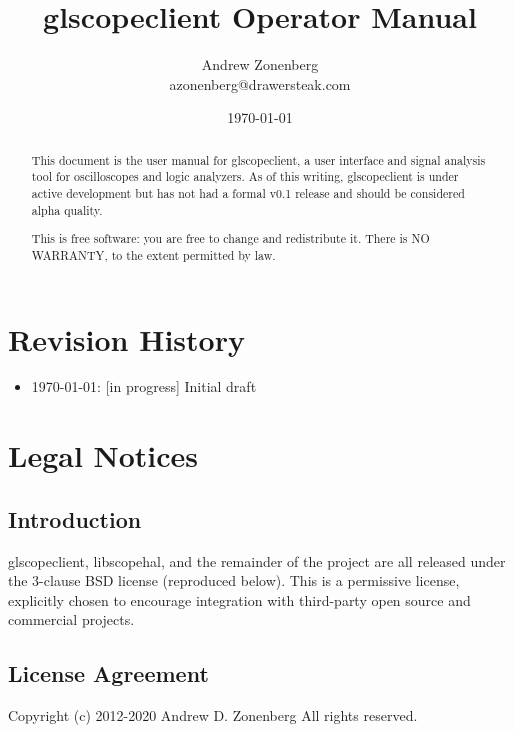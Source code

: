 \documentclass[11pt]{article}
\begin{document}
\title{glscopeclient Operator Manual}
\author{Andrew Zonenberg\\
azonenberg@drawersteak.com}
\date{\today}

\maketitle
\begin{abstract} \normalsize
This document is the user manual for glscopeclient, a user interface and signal analysis tool for oscilloscopes and
logic analyzers. As of this writing, glscopeclient is under active development but has not had a formal v0.1 release
and should be considered alpha quality.

This is free software: you are free to change and redistribute it.
There is NO WARRANTY, to the extent permitted by law.
\end{abstract}
\thispagestyle{empty}

\pagebreak

\tableofcontents

\pagebreak
\section{Revision History}
\begin{itemize}
\item \today: [in progress] Initial draft
\end{itemize}

\pagebreak
\section{Legal Notices}

\subsection{Introduction}

glscopeclient, libscopehal, and the remainder of the project are all released under the 3-clause BSD license
(reproduced below). This is a permissive license, explicitly chosen to encourage integration with third-party open
source and commercial projects.

\subsection{License Agreement}

Copyright (c) 2012-2020 Andrew D. Zonenberg
All rights reserved.
\end{document}

